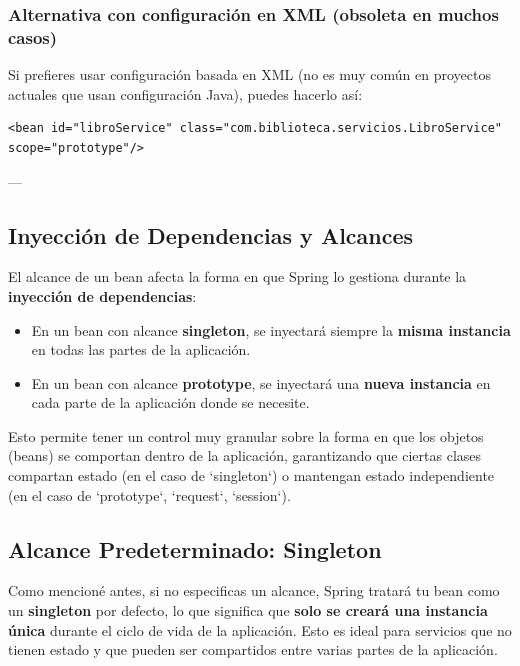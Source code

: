 \documentclass[11pt]{article}
\begin{document}
\subsubsection{Alternativa con configuración en XML (obsoleta en muchos casos)}
\label{sec:org111ee6a}
Si prefieres usar configuración basada en XML (no es muy común en proyectos actuales que usan configuración Java), puedes hacerlo así:

\begin{verbatim}
<bean id="libroService" class="com.biblioteca.servicios.LibroService" scope="prototype"/>
\end{verbatim}

---

\subsection{Inyección de Dependencias y Alcances}
\label{sec:orgfaf67ef}
El alcance de un bean afecta la forma en que Spring lo gestiona durante la \textbf{\textbf{inyección de dependencias}}:

\begin{itemize}
\item En un bean con alcance \textbf{\textbf{singleton}}, se inyectará siempre la \textbf{\textbf{misma instancia}} en todas las partes de la aplicación.
\item En un bean con alcance \textbf{\textbf{prototype}}, se inyectará una \textbf{\textbf{nueva instancia}} en cada parte de la aplicación donde se necesite.
\end{itemize}

Esto permite tener un control muy granular sobre la forma en que los objetos (beans) se comportan dentro de la aplicación, garantizando que ciertas clases compartan estado (en el caso de `singleton`) o mantengan estado independiente (en el caso de `prototype`, `request`, `session`).

\subsection{Alcance Predeterminado: Singleton}
\label{sec:org3982784}
Como mencioné antes, si no especificas un alcance, Spring tratará tu bean como un \textbf{\textbf{singleton}} por defecto, lo que significa que \textbf{\textbf{solo se creará una instancia única}} durante el ciclo de vida de la aplicación. Esto es ideal para servicios que no tienen estado y que pueden ser compartidos entre varias partes de la aplicación.
\end{document}
